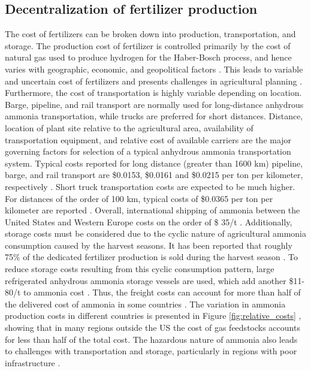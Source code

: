 \subsection{Decentralization of fertilizer production}
\label{sec:decentralized}

The cost of fertilizers can be broken down into production, transportation, and storage. The production cost of fertilizer is controlled primarily by the cost of natural gas used to produce hydrogen for the Haber-Bosch process, and hence varies with geographic, economic, and geopolitical factors \cite{Huang2007,Etienne2016}. 
This leads to variable and uncertain cost of fertilizers and presents challenges in agricultural planning \cite{Etienne2016}. Furthermore, the cost of transportation is highly variable depending on location. Barge, pipeline, and rail transport are normally used for long-distance anhydrous ammonia transportation, while trucks are preferred for short distances. Distance, location of plant site relative to the agricultural area, availability of transportation equipment, and relative cost of available carriers are the major governing factors for selection of a typical anhydrous ammonia transportation system. Typical costs reported for long distance (greater than 1600 km) pipeline, barge, and rail transport are \$0.0153, \$0.0161 and \$0.0215 per ton per kilometer, respectively \cite{ammonia_encyclopedia}.  Short truck transportation costs are expected to be much higher. For distances of the order of 100 km, typical costs of \$0.0365 per ton per kilometer are reported \needcite. Overall, international shipping of ammonia between the United States and Western Europe costs on the order of \$ 35/t \needcite. Additionally, storage costs must be considered due to the cyclic nature of agricultural ammonia consumption caused by the harvest seasons. It has been reported that roughly 75\% of the dedicated fertilizer production is sold during the harvest season \needcite. To reduce storage costs resulting from this cyclic consumption pattern, large refrigerated anhydrous ammonia storage vessels are used, which add another \$11-80/t to ammonia cost \cite{IFDC_1998,ammonia_encyclopedia}. Thus, the freight costs can account for more than half of the delivered cost of ammonia in some countries \needcite. The variation in ammonia production costs in different countries is presented in Figure \ref{fig:relative_costs} \cite{maxwell2004synthetic}, showing that in many regions outside the US the cost of gas feedstocks accounts for less than half of the total cost. The hazardous nature of ammonia also leads to challenges with transportation and storage, particularly in regions with poor infrastructure \cite{Etienne2016}. 

